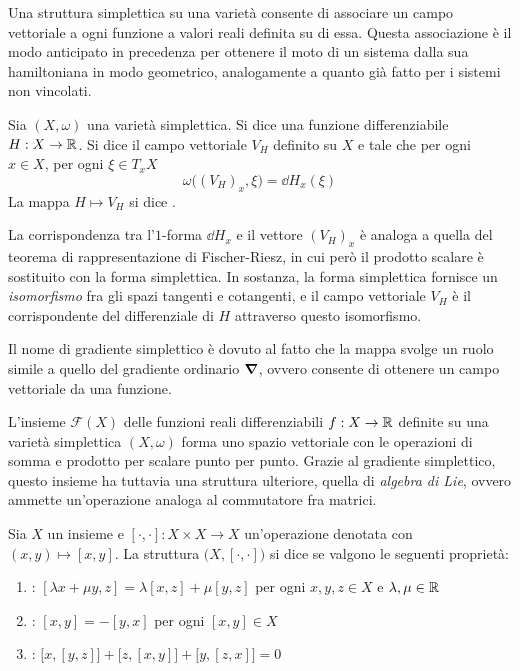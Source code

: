 Una struttura simplettica su una varietà consente di associare un campo vettoriale a ogni funzione a valori reali definita su di essa. Questa associazione è il modo anticipato in precedenza per ottenere il moto di un sistema dalla sua hamiltoniana in modo geometrico, analogamente a quanto già fatto per i sistemi non vincolati.
\begin{definition} \label{def:hamField}
  Sia $(X, \omega)$ una varietà simplettica. Si dice  una funzione differenziabile $H: X \to \mathbb{R}$. Si dice  il campo vettoriale $V_H$ definito su $X$ e tale che per ogni $x \in X$, per ogni $\xi \in T_x X$
  \begin{equation} \label{eq:hamField}
    \omega\big((V_H)_x, \xi\big) = \dd{H}_x(\xi)
  \end{equation}
  La mappa $H \mapsto V_H$ si dice .
\end{definition}
\begin{remark}
  La corrispondenza tra l'$1$-forma $\dd{H}_x$ e il vettore $(V_H)_x$ è analoga a quella del teorema di rappresentazione di Fischer-Riesz, in cui però il prodotto scalare è sostituito con la forma simplettica. In sostanza, la forma simplettica fornisce un \emph{isomorfismo} fra gli spazi tangenti e cotangenti, e il campo vettoriale $V_H$ è il corrispondente del differenziale di $H$ attraverso questo isomorfismo.
\end{remark}
\begin{remark}
  Il nome di gradiente simplettico è dovuto al fatto che la mappa svolge un ruolo simile a quello del gradiente ordinario $\grad$, ovvero consente di ottenere un campo vettoriale da una funzione.
\end{remark}

L'insieme $\mathcal{F}(X)$ delle funzioni reali differenziabili $f:X \to \mathbb{R}$ definite su una varietà simplettica $(X, \omega)$ forma uno spazio vettoriale con le operazioni di somma e prodotto per scalare punto per punto. Grazie al gradiente simplettico, questo insieme ha tuttavia una struttura ulteriore, quella di \emph{algebra di Lie}, ovvero ammette un'operazione analoga al commutatore fra matrici.
\begin{definition}
  Sia $X$ un insieme e $[\cdot , \cdot]:X \times X \to X$ un'operazione denotata con $(x,y) \mapsto [x,y]$. La struttura $\big(X, [\cdot ,\cdot ]\big)$ si dice  se valgono le seguenti proprietà: \begin{enumerate}
    \item {}: $[\lambda x + \mu y, z] = \lambda [x, z] + \mu[y,z]$ per ogni $x,y,z \in X$ e $\lambda, \mu \in  \mathbb{R}$
    \item {}: $[x,y] = -[y,x]$ per ogni $[x,y] \in X$
    \item {}: $\big[x,[y,z]\big] + \big[z,[x,y]\big] + \big[y,[z,x]\big] = 0$
  \end{enumerate}
\end{definition}

